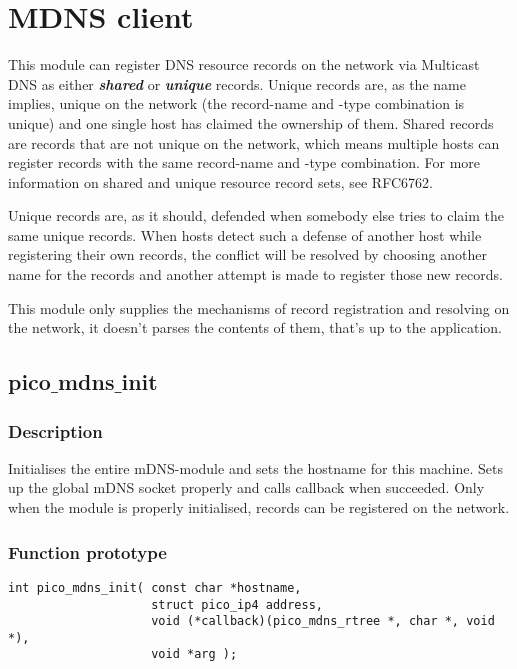 \section{MDNS client}

This module can register DNS resource records on the network via Multicast DNS as either \textbf{\emph{shared}} or \textbf{\emph{unique}} records. Unique records are, as the name implies, unique on the network (the record-name and -type combination is unique) and one single host has claimed the ownership of them. Shared records are records that are not unique on the network, which means multiple hosts can register records with the same record-name and -type combination. For more information on shared and unique resource record sets, see RFC6762.

Unique records are, as it should, defended when somebody else tries to claim the same unique records. When hosts detect such a defense of another host while registering their own records, the conflict will be resolved by choosing another name for the records and another attempt is made to register those new records.

This module only supplies the mechanisms of record registration and resolving on the network, it doesn't parses the contents of them, that's up to the application.

\subsection{pico$\_$mdns$\_$init}

\subsubsection*{Description}
Initialises the entire mDNS-module and sets the hostname for this machine. Sets up the global mDNS socket properly and calls callback when succeeded. Only when the module is properly initialised, records can be registered on the network.
\subsubsection*{Function prototype}
\begin{verbatim}
int pico_mdns_init( const char *hostname, 
                    struct pico_ip4 address, 
                    void (*callback)(pico_mdns_rtree *, char *, void *), 
                    void *arg );
\end{verbatim}

